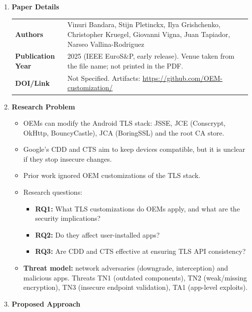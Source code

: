 \documentclass[11pt,a4paper]{article}
\newcommand{\entrypart}[1]{\textbf{\color{accent}#1}\par\vspace{2pt}}
\begin{document}
\begin{enumerate}

    \item \entrypart{Paper Details}

    \begin{tabular}{@{}>{\bfseries}p{3.2cm} p{11.5cm}@{}}
        Authors          & Vinuri Bandara, Stijn Pletinckx, Ilya Grishchenko, Christopher Kruegel, Giovanni Vigna, Juan Tapiador, Narseo Vallina-Rodriguez \\[2pt]
        Publication Year & 2025 (IEEE EuroS\&P, early release). Venue taken from the file name; not printed in the PDF. \\[2pt]
        DOI/Link         & Not Specified. Artifacts: \url{https://github.com/OEM-customization/}
    \end{tabular}

    \item \entrypart{Research Problem}

    \begin{itemize}
        \item OEMs can modify the Android TLS stack: JSSE, JCE (Conscrypt, OkHttp, BouncyCastle), JCA (BoringSSL) and the root CA store.
        \item Google's CDD and CTS aim to keep devices compatible, but it is unclear if they stop insecure changes.
        \item Prior work ignored OEM customizations of the TLS stack.
        \item Research questions:
        \begin{itemize}
            \item \textbf{RQ1:} What TLS customizations do OEMs apply, and what are the security implications?
            \item \textbf{RQ2:} Do they affect user-installed apps?
            \item \textbf{RQ3:} Are CDD and CTS effective at ensuring TLS API consistency?
        \end{itemize}
        \item \textbf{Threat model:} network adversaries (downgrade, interception) and malicious apps. Threats TN1 (outdated components), TN2 (weak/missing encryption), TN3 (insecure endpoint validation), TA1 (app-level exploits).
    \end{itemize}

    \item \entrypart{Proposed Approach}


\end{enumerate}
\end{document}
